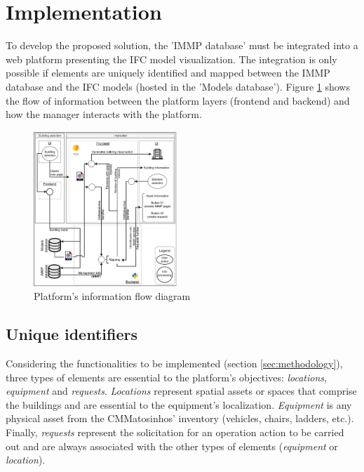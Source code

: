 \documentclass[a4paper, 10pt, twocolumn, twoside]{article}
\begin{document}
\section{Implementation}
\label{sec:implementation}

To develop the proposed solution, the 'IMMP database' must be integrated into a web platform presenting the IFC model visualization. The integration is only possible if elements are uniquely identified and mapped between the IMMP database and the IFC models (hosted in the 'Models database'). Figure \ref{fig_fluxo} shows the flow of information between the platform layers (frontend and backend) and how the manager interacts with the platform.

\begin{figure}[!htb]
    \centering
    \includegraphics[width=0.48\textwidth]{Images/fluxo.pdf}
    \caption{Platform's information flow diagram}
    \label{fig_fluxo}
\end{figure}

\subsection{Unique identifiers}
\label{subsec:identifiers}

Considering the functionalities to be implemented (section \ref{sec:methodology}), three types of elements are essential to the platform's objectives: \emph{locations}, \emph{equipment} and \emph{requests}. \emph{Locations} represent spatial assets or spaces that comprise the buildings and are essential to the equipment's localization. \emph{Equipment} is any physical asset from the CMMatosinhos' inventory (vehicles, chairs, ladders, etc.). Finally, \emph{requests} represent the solicitation for an operation action to be carried out and are always associated with the other types of elements (\emph{equipment} or \emph{location}).
\end{document}
